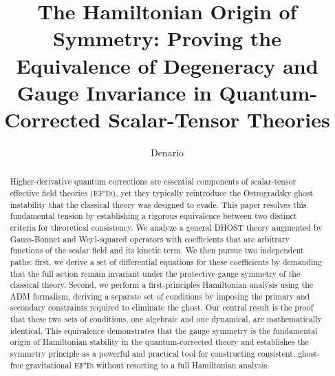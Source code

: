 \documentclass[twocolumn]{aastex631}
\begin{document}
\title{The Hamiltonian Origin of Symmetry: Proving the Equivalence of Degeneracy and Gauge Invariance in Quantum-Corrected Scalar-Tensor Theories}

\author{Denario}

\begin{abstract}
Higher-derivative quantum corrections are essential components of scalar-tensor effective field theories (EFTs), yet they typically reintroduce the Ostrogradsky ghost instability that the classical theory was designed to evade. This paper resolves this fundamental tension by establishing a rigorous equivalence between two distinct criteria for theoretical consistency. We analyze a general DHOST theory augmented by Gauss-Bonnet and Weyl-squared operators with coefficients that are arbitrary functions of the scalar field and its kinetic term. We then pursue two independent paths: first, we derive a set of differential equations for these coefficients by demanding that the full action remain invariant under the protective gauge symmetry of the classical theory. Second, we perform a first-principles Hamiltonian analysis using the ADM formalism, deriving a separate set of conditions by imposing the primary and secondary constraints required to eliminate the ghost. Our central result is the proof that these two sets of conditions, one algebraic and one dynamical, are mathematically identical. This equivalence demonstrates that the gauge symmetry is the fundamental origin of Hamiltonian stability in the quantum-corrected theory and establishes the symmetry principle as a powerful and practical tool for constructing consistent, ghost-free gravitational EFTs without resorting to a full Hamiltonian analysis.
\end{abstract}

\end{document}
